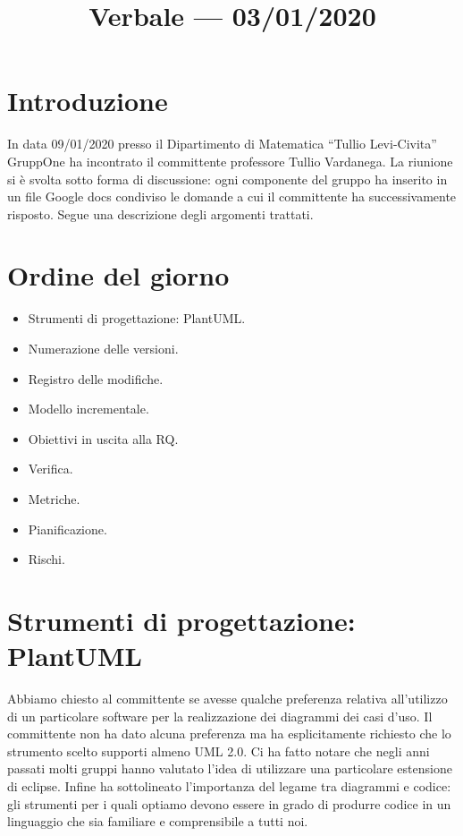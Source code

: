 \documentclass{article}
\title{Verbale --- 03/01/2020}
\begin{document}


\section{Introduzione}%
\label{sec:introduzione}

In data 09/01/2020 presso il Dipartimento di Matematica ``Tullio Levi-Civita'' GruppOne ha incontrato il committente professore Tullio Vardanega. La riunione si è svolta sotto forma di discussione: ogni componente del gruppo ha inserito in un file Google docs condiviso le domande a cui il committente ha successivamente risposto. Segue una descrizione degli argomenti trattati.

\section{Ordine del giorno}%
\label{sec:ordine_del_giorno}

\begin{itemize}
  \item Strumenti di progettazione: PlantUML\@.
  \item Numerazione delle versioni.
  \item Registro delle modifiche.
  \item Modello incrementale.
  \item Obiettivi in uscita alla RQ\@.
  \item Verifica.
  \item Metriche.
  \item Pianificazione.
  \item Rischi.
\end{itemize}

\section{Strumenti di progettazione: PlantUML}%
\label{sec:strumenti_di_progettazione_plantuml}

Abbiamo chiesto al committente se avesse qualche preferenza relativa all'utilizzo di un particolare software per la realizzazione dei diagrammi dei casi d'uso. Il committente non ha dato alcuna preferenza ma ha esplicitamente richiesto che lo strumento scelto supporti almeno UML 2.0. Ci ha fatto notare che negli anni passati molti gruppi hanno valutato l'idea di utilizzare una particolare estensione di eclipse. Infine ha sottolineato l'importanza del legame tra diagrammi e codice: gli strumenti per i quali optiamo devono essere in grado di produrre codice in un linguaggio che sia familiare e comprensibile a tutti noi.
\end{document}
